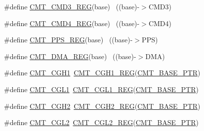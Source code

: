 \begin{DoxyCompactItemize}
\item 
\#define \hyperlink{group___c_m_t___register___accessor___macros_gae48de2fa2e70ed138d31e8369dfa5a3a}{C\+M\+T\+\_\+\+C\+M\+D3\+\_\+\+R\+EG}(base)                                          ~((base)-\/$>$C\+M\+D3)
\item 
\#define \hyperlink{group___c_m_t___register___accessor___macros_ga3d423ab9fbac444983cf6a0dc2071d38}{C\+M\+T\+\_\+\+C\+M\+D4\+\_\+\+R\+EG}(base)                                          ~((base)-\/$>$C\+M\+D4)
\item 
\#define \hyperlink{group___c_m_t___register___accessor___macros_ga303f728da6c3205380186128b2a9001c}{C\+M\+T\+\_\+\+P\+P\+S\+\_\+\+R\+EG}(base)                                            ~((base)-\/$>$P\+PS)
\item 
\#define \hyperlink{group___c_m_t___register___accessor___macros_gaa749274da5a6a51144a4423bed217248}{C\+M\+T\+\_\+\+D\+M\+A\+\_\+\+R\+EG}(base)                                            ~((base)-\/$>$D\+MA)
\item 
\#define \hyperlink{group___c_m_t___register___accessor___macros_ga4c7d1dfd83c5f57747e3ab42a5a95f1c}{C\+M\+T\+\_\+\+C\+G\+H1}~\hyperlink{group___c_m_t___register___accessor___macros_ga1f00c7e08c77c8d2388cc2f0f819d187}{C\+M\+T\+\_\+\+C\+G\+H1\+\_\+\+R\+EG}(\hyperlink{group___c_m_t___peripheral_gae361f199741d5276c4618edb9ee289b7}{C\+M\+T\+\_\+\+B\+A\+S\+E\+\_\+\+P\+TR})
\item 
\#define \hyperlink{group___c_m_t___register___accessor___macros_ga9e3e0d298f924d87194b810b6650e7b7}{C\+M\+T\+\_\+\+C\+G\+L1}~\hyperlink{group___c_m_t___register___accessor___macros_ga771dd48290399c3c4f3b104299e28f66}{C\+M\+T\+\_\+\+C\+G\+L1\+\_\+\+R\+EG}(\hyperlink{group___c_m_t___peripheral_gae361f199741d5276c4618edb9ee289b7}{C\+M\+T\+\_\+\+B\+A\+S\+E\+\_\+\+P\+TR})
\item 
\#define \hyperlink{group___c_m_t___register___accessor___macros_ga7d10215d9de6abb5a00248c99a6cdd5f}{C\+M\+T\+\_\+\+C\+G\+H2}~\hyperlink{group___c_m_t___register___accessor___macros_ga8aeb87a39cf6d86e317a6ddb8340e8fa}{C\+M\+T\+\_\+\+C\+G\+H2\+\_\+\+R\+EG}(\hyperlink{group___c_m_t___peripheral_gae361f199741d5276c4618edb9ee289b7}{C\+M\+T\+\_\+\+B\+A\+S\+E\+\_\+\+P\+TR})
\item 
\#define \hyperlink{group___c_m_t___register___accessor___macros_ga876610d3a8662684c6a321c84f275c2b}{C\+M\+T\+\_\+\+C\+G\+L2}~\hyperlink{group___c_m_t___register___accessor___macros_gac1baf38413e70d4e3077963d08d67c1a}{C\+M\+T\+\_\+\+C\+G\+L2\+\_\+\+R\+EG}(\hyperlink{group___c_m_t___peripheral_gae361f199741d5276c4618edb9ee289b7}{C\+M\+T\+\_\+\+B\+A\+S\+E\+\_\+\+P\+TR})

\end{DoxyCompactItemize}
